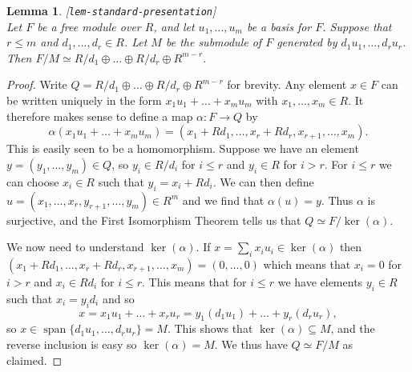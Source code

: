 \documentclass{amsart}
\newcommand{\lbl}[1]{\label{#1}\textup{[\texttt{#1}]}\ \\}
\newcommand{\lbl}{\label}
\newcommand{\spn}       {\operatorname{span}}
\newcommand{\al}        {\alpha}
\newcommand{\sse}       {\subseteq}
\newcommand{\xra}       {\xrightarrow}
\newcommand{\op}        {\oplus}
\renewcommand{\:}{\colon}
\newtheorem{lemma}[theorem]{Lemma}
\theoremstyle{definition}
\begin{document}
\begin{lemma}\lbl{lem-standard-presentation}
 Let $F$ be a free module over $R$, and let $u_1,\ldots,u_m$ be a
 basis for $F$.  Suppose that $r\leq m$ and $d_1,\ldots,d_r\in R$.
 Let $M$ be the submodule of $F$ generated by $d_1u_1,\ldots,d_ru_r$.
 Then $F/M\simeq R/d_1\op\ldots\op R/d_r\op R^{m-r}$.
\end{lemma} 
\begin{proof}
 Write $Q=R/d_1\op\ldots\op R/d_r\op R^{m-r}$ for brevity.  Any
 element $x\in F$ can be written uniquely in the form
 $x_1u_1+\ldots+x_mu_m$ with $x_1,\ldots,x_m\in R$.  It therefore
 makes sense to define a map $\al\:F\xra{}Q$ by 
 \[ \al(x_1u_1+\ldots+x_mu_m) = 
     (x_1+Rd_1,\ldots,x_r+Rd_r,x_{r+1},\ldots,x_m). 
 \]
 This is easily seen to be a homomorphism. Suppose we have an element
 $y=(y_1,\ldots,y_m)\in Q$, so $y_i\in R/d_i$ for $i\leq r$ and
 $y_i\in R$ for $i>r$.  For $i\leq r$ we can choose $x_i\in R$ such
 that $y_i=x_i+Rd_i$.  We can then define
 $u=(x_1,\ldots,x_r,y_{r+1},\ldots,y_m)\in R^m$ and we find that
 $\al(u)=y$.  Thus $\al$ is surjective, and the First Isomorphism
 Theorem tells us that $Q\simeq F/\ker(\al)$.

 We now need to understand $\ker(\al)$.  If
 $x=\sum_ix_iu_i\in\ker(\al)$ then
 $(x_1+Rd_1,\ldots,x_r+Rd_r,x_{r+1},\ldots,x_m)=(0,\ldots,0)$ which
 means that $x_i=0$ for $i>r$ and $x_i\in Rd_i$ for $i\leq r$.  This
 means that for $i\leq r$ we have elements $y_i\in R$ such that
 $x_i=y_id_i$ and so 
 \[ x=x_1u_1+\ldots+x_ru_r=y_1(d_1u_1)+\ldots+y_r(d_ru_r), \]
 so $x\in\spn\{d_1u_1,\ldots,d_ru_r\}=M$.  This shows that
 $\ker(\al)\sse M$, and the reverse inclusion is easy so
 $\ker(\al)=M$.  We thus have $Q\simeq F/M$ as claimed.
\end{proof}
\end{document}
